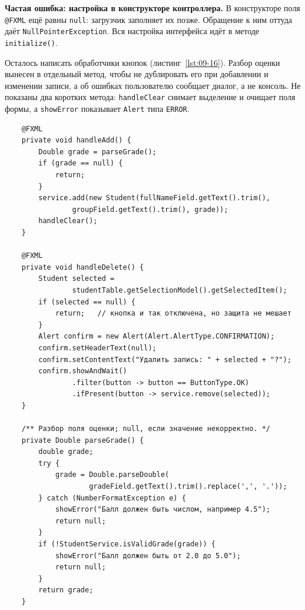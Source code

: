 \begin{oshibka}
\textbf{Частая ошибка: настройка в конструкторе контроллера.} В конструкторе
поля \texttt{@FXML} ещё равны \texttt{null}: загрузчик заполняет их позже.
Обращение к ним оттуда даёт \texttt{NullPointerException}. Вся настройка
интерфейса идёт в методе \texttt{initialize()}.
\end{oshibka}

Осталось написать обработчики кнопок (листинг~\ref{lst:09-16}). Разбор оценки
вынесен в отдельный метод, чтобы не дублировать его при добавлении и изменении
записи, а об ошибках пользователю сообщает диалог, а не консоль. Не показаны два
коротких метода: \texttt{handleClear} снимает выделение и очищает поля формы, а
\texttt{showError} показывает \texttt{Alert} типа \texttt{ERROR}.

\begin{listing}[H]
\begin{verbatim}
    @FXML
    private void handleAdd() {
        Double grade = parseGrade();
        if (grade == null) {
            return;
        }
        service.add(new Student(fullNameField.getText().trim(),
                groupField.getText().trim(), grade));
        handleClear();
    }

    @FXML
    private void handleDelete() {
        Student selected =
                studentTable.getSelectionModel().getSelectedItem();
        if (selected == null) {
            return;   // кнопка и так отключена, но защита не мешает
        }
        Alert confirm = new Alert(Alert.AlertType.CONFIRMATION);
        confirm.setHeaderText(null);
        confirm.setContentText("Удалить запись: " + selected + "?");
        confirm.showAndWait()
                .filter(button -> button == ButtonType.OK)
                .ifPresent(button -> service.remove(selected));
    }

    /** Разбор поля оценки; null, если значение некорректно. */
    private Double parseGrade() {
        double grade;
        try {
            grade = Double.parseDouble(
                    gradeField.getText().trim().replace(',', '.'));
        } catch (NumberFormatException e) {
            showError("Балл должен быть числом, например 4.5");
            return null;
        }
        if (!StudentService.isValidGrade(grade)) {
            showError("Балл должен быть от 2.0 до 5.0");
            return null;
        }
        return grade;
    }
\end{verbatim}
\caption{Контроллер: обработчики кнопок}
\label{lst:09-16}
\end{listing}

